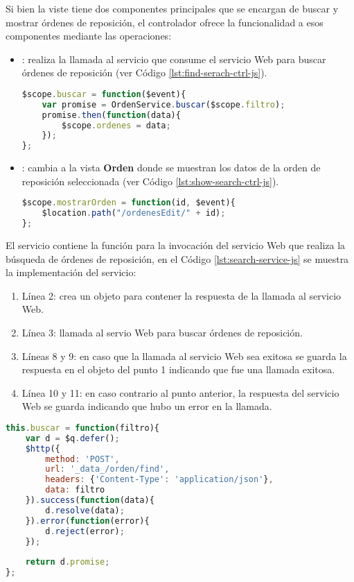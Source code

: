 Si bien la viste tiene dos componentes principales que se encargan de buscar y mostrar órdenes de reposición, el controlador  ofrece la funcionalidad a esos componentes mediante las operaciones:
\begin{itemize}
	\item {}: realiza la llamada al servicio que consume el servicio Web para buscar órdenes de reposición (ver Código \ref{lst:find-serach-ctrl-js}).
\begin{lstlisting}[language=Javascript, caption={Función para llamar el servicio de búsqueda de órdenes de reposición.}, captionpos=b, label={lst:find-serach-ctrl-js}]
$scope.buscar = function($event){
	var promise = OrdenService.buscar($scope.filtro);
	promise.then(function(data){
		$scope.ordenes = data;
	});
};
\end{lstlisting}

	\item {}: cambia a la vista \textbf{Orden} donde se muestran los datos de la orden de reposición seleccionada (ver Código \ref{lst:show-search-ctrl-js}).
\begin{lstlisting}[language=Javascript, caption={Función para mostrar la vista de una orden de reposición.}, captionpos=b, label={lst:show-search-ctrl-js}]
$scope.mostrarOrden = function(id, $event){
	$location.path("/ordenesEdit/" + id);
};
\end{lstlisting}
\end{itemize}

El servicio  contiene la función para la invocación del servicio Web que realiza la búsqueda de órdenes de reposición, en el Código \ref{lst:search-service-js} se muestra la implementación del servicio:
\begin{enumerate}
	\item Línea 2: crea un objeto para contener la respuesta de la llamada al servicio Web.
	\item Línea 3: llamada al servio Web para buscar órdenes de reposición.
	\item Líneas 8 y 9: en caso que la llamada al servicio Web sea exitosa se guarda la respuesta en el objeto del punto 1 indicando que fue una llamada exitosa.
	\item Línea 10 y 11: en caso contrario al punto anterior, la respuesta del servicio Web se guarda indicando que hubo un error en la llamada.
\end{enumerate}

\begin{lstlisting}[language=Javascript, caption={Servicio de AngularJS para buscar órdenes de reposición.}, captionpos=b, label={lst:search-service-js}]
this.buscar = function(filtro){
	var d = $q.defer();
	$http({
		method: 'POST',
		url: '_data_/orden/find',
		headers: {'Content-Type': 'application/json'},
		data: filtro
	}).success(function(data){
		d.resolve(data);
	}).error(function(error){
		d.reject(error);
	});
	
	return d.promise;
};
\end{lstlisting}

